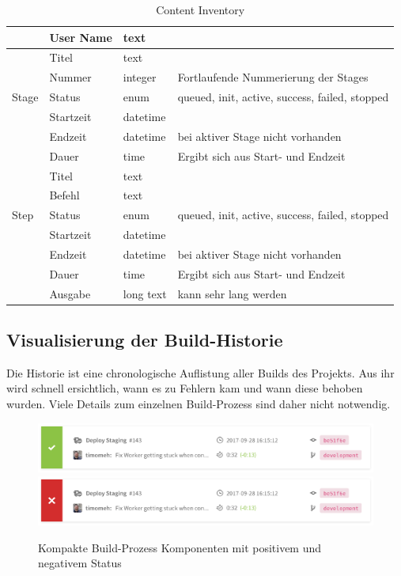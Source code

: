 \begin{table}[H]
\begin{tabularx}{\textwidth}{| l | p{4cm} | l | X |}
      & User Name & text &  \\ \hline
    \multirow{5}{*}{Stage} & Titel & text &  \\ \cline{2-4}
      & Nummer & integer & Fortlaufende Nummerierung der Stages \\ \cline{2-4}
      & Status & enum & queued, init, active, success, failed, stopped \\ \cline{2-4}
      & Startzeit & datetime &  \\ \cline{2-4}
      & Endzeit & datetime & bei aktiver Stage nicht vorhanden \\ \cline{2-4}
      & Dauer & time & Ergibt sich aus Start- und Endzeit \\ \hline
    \multirow{5}{*}{Step} & Titel & text &  \\ \cline{2-4}
      & Befehl & text &  \\ \cline{2-4}
      & Status & enum & queued, init, active, success, failed, stopped \\ \cline{2-4}
      & Startzeit & datetime &  \\ \cline{2-4}
      & Endzeit & datetime & bei aktiver Stage nicht vorhanden \\ \cline{2-4}
      & Dauer & time & Ergibt sich aus Start- und Endzeit \\ \cline{2-4}
      & Ausgabe & long text & kann sehr lang werden \\ \hline
  \end{tabularx}
  \caption{Content Inventory}
  \label{tab:content-inventory}
\end{table}

\subsection{Visualisierung der Build-Historie}
\label{subsec:visualisierung-build-history}

Die Historie ist eine chronologische Auflistung aller Builds des Projekts. Aus ihr wird schnell ersichtlich, wann es zu Fehlern kam und wann diese behoben wurden. Viele Details zum einzelnen Build-Prozess sind daher nicht notwendig.

\begin{figure}[h]
  \caption{Kompakte Build-Prozess Komponenten mit positivem und negativem Status}
  \label{fig:build-process-short}
  \centering
    \includegraphics[width=\textwidth]{assets/build-overview-finished}
    \includegraphics[width=\textwidth]{assets/build-overview-failed}
\end{figure}


